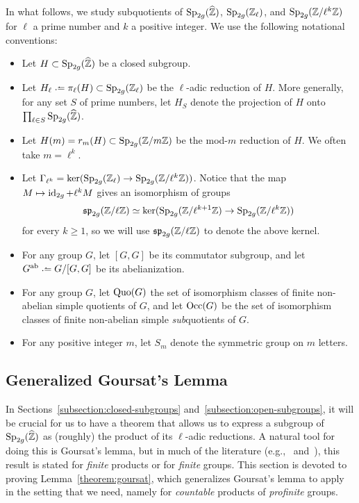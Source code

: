 In what follows, we study subquotients of $\operatorname{Sp}_{2g}(\widehat{\mathbb Z})$, $\operatorname{Sp}_{2g}(\mathbb Z_\ell)$, and $\operatorname{Sp}_{2g}(\mathbb Z/ \ell^k \mathbb Z)$ for $\ell$ a prime number and $k$ a positive integer. We use the following notational conventions:
\begin{itemize}
\item Let $H\subset \operatorname{Sp}_{2g}(\widehat{\mathbb Z})$ be a closed subgroup.
\item Let $H_{\ell} \defeq \pi_\ell(H) \subset \Sp_{2g}(\ZZ_\ell)$ be the $\ell$-adic reduction of $H$. More generally, for any set $S$ of prime numbers, let $H_S$ denote the projection of $H$ onto $\prod_{\ell \in S} \operatorname{Sp}_{2g}(\widehat{\mathbb Z})$.
\item Let $H(m) = r_{m}(H) \subset \operatorname{Sp}_{2g}(\mathbb Z/m \mathbb Z)$ be the mod-$m$ reduction of $H$. We often take $m = \ell^k$.
\item Let $\Gamma_{\ell^k} = \ker(\operatorname{Sp}_{2g}(\mathbb Z_\ell) \to \operatorname{Sp}_{2g}(\mathbb Z/ \ell^k \mathbb Z))$. Notice that the map $M \mapsto \operatorname{id}_{2g} + \ell^k M$ gives an isomorphism of groups
$$\mathfrak{sp}_{2g}(\mathbb Z/ \ell \mathbb Z) \simeq \ker(\operatorname{Sp}_{2g}(\mathbb Z/\ell^{k+1} \mathbb Z) \to \operatorname{Sp}_{2g}(\mathbb Z/ \ell^k \mathbb Z))$$
for every $k \geq 1$, so we will use $\mathfrak{sp}_{2g}(\mathbb Z/\ell\mathbb Z)$ to denote the above kernel.
\item For any group $G$, let $[G,G]$ be its commutator subgroup, and let $G^{\ab} \defeq G/{ {[G,G]}}$ be its abelianization.
\item For any group $G$, let $\operatorname{Quo}(G)$ the set of isomorphism classes of finite non-abelian simple quotients of $G$, and let $\operatorname{Occ}(G)$ be the set of isomorphism classes of finite non-abelian simple \emph{sub}quotients of $G$.
\item For any positive integer $m$, let $S_m$ denote the symmetric group on $m$ letters.
\end{itemize}

\subsection{Generalized Goursat's Lemma}

In Sections~\ref{subsection:closed-subgroups} and~\ref{subsection:open-subgroups}, it will be crucial for us to have a theorem that allows us to express a subgroup of $\operatorname{Sp}_{2g}(\widehat{\mathbb Z})$ as (roughly) the product of its $\ell$-adic reductions. A natural tool for doing this is Goursat's lemma, but in much of the literature (e.g.,~\cite[Lemma 5.2.1]{ribbit} and~\cite[Lemma A.4]{zywina2010elliptic}), this result is stated for \emph{finite} products or for \emph{finite} groups. This section is devoted to proving Lemma~\ref{theorem:goursat}, which generalizes Goursat's lemma to apply in the setting that we need, namely for \emph{countable} products of \emph{profinite} groups.
	
